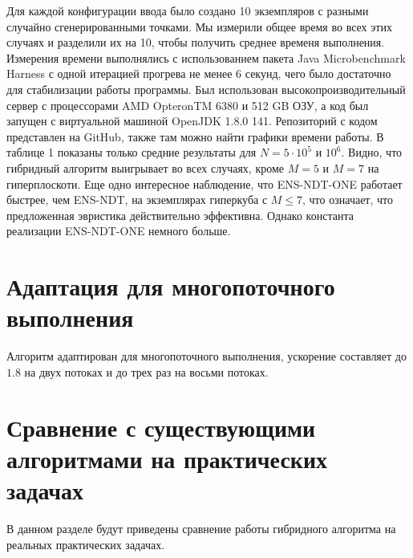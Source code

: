 Для каждой конфигурации ввода было создано 10 экземпляров с разными случайно сгенерированными точками. Мы измерили общее время во всех этих случаях и разделили их на 10, чтобы получить среднее временя выполнения. Измерения времени выполнялись с использованием пакета Java Microbenchmark Harness с одной итерацией прогрева не менее 6 секунд, чего было достаточно для стабилизации работы программы. Был использован высокопроизводительный сервер с процессорами AMD OpteronTM 6380 и 512 GB ОЗУ, а код был запущен с виртуальной машиной OpenJDK 1.8.0 141.
Репозиторий с кодом представлен на GitHub, также там можно найти графики времени работы. В таблице 1 показаны только средние результаты для $ N = 5 \cdot 10 ^ 5 $ и $ 10 ^ 6 $. Видно, что гибридный алгоритм выигрывает во всех случаях, кроме $ M = 5 $ и $ M = 7 $ на гиперплоскоти. Еще одно интересное наблюдение, что ENS-NDT-ONE работает быстрее, чем ENS-NDT, на экземплярах гиперкуба с $ M \leq 7 $, что означает, что предложенная эвристика действительно эффективна. Однако константа реализации ENS-NDT-ONE немного больше.

\section{Адаптация для многопоточного выполнения}

Алгоритм адаптирован для многопоточного выполнения, ускорение составляет до $1.8$ на двух потоках и до трех раз на восьми потоках.

\section{Сравнение с существующими алгоритмами на практических задачах}
В данном разделе будут приведены сравнение работы гибридного алгоритма на реальных практических задачах.


